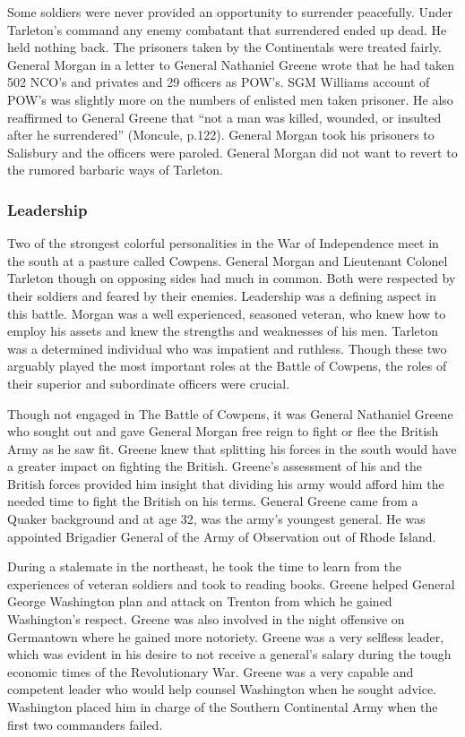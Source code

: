 Some soldiers were never provided an opportunity to surrender peacefully. Under
Tarleton’s command any enemy combatant that surrendered ended up dead.  He held
nothing back. The prisoners taken by the Continentals were treated fairly.
General Morgan in a letter to General Nathaniel Greene wrote that he had taken
502 NCO’s and privates and 29 officers as POW’s.  SGM Williams account of POW’s
was slightly more on the numbers of enlisted men taken prisoner. He also
reaffirmed to General Greene that “not a man was killed, wounded, or insulted
after he surrendered” (Moncule, p.122).  General Morgan took his prisoners to
Salisbury and the officers were paroled. General Morgan did not want to revert
to the rumored barbaric ways of Tarleton. 

\subsubsection{Leadership}

Two of the strongest colorful personalities in the War of Independence meet in
the south at a pasture called Cowpens. General Morgan and Lieutenant Colonel
Tarleton though on opposing sides had much in common. Both were respected by
their soldiers and feared by their enemies. Leadership was a defining aspect in
this battle.  Morgan was a well experienced, seasoned veteran, who knew how to
employ his assets and knew the strengths and weaknesses of his men.  Tarleton
was a determined individual who was impatient and ruthless. Though these two
arguably played the most important roles at the Battle of Cowpens, the roles of
their superior and subordinate officers were crucial. 

Though not engaged in The Battle of Cowpens, it was General Nathaniel Greene who
sought out and gave General Morgan free reign to fight or flee the British Army
as he saw fit.  Greene knew that splitting his forces in the south would have a
greater impact on fighting the British. Greene’s assessment of his and the
British forces provided him insight that dividing his army would afford him the
needed time to fight the British on his terms. General Greene came from a Quaker
background and at age 32, was the army’s youngest general. He was appointed
Brigadier General of the Army of Observation out of Rhode Island.

During a stalemate in the northeast, he took the time to learn from the
experiences of veteran soldiers and took to reading books. Greene helped General
George Washington plan and attack on Trenton from which he gained Washington’s
respect. Greene was also involved in the night offensive on Germantown where he
gained more notoriety. Greene was a very selfless leader, which was evident in
his desire to not receive a general’s salary during the tough economic times of
the Revolutionary War. Greene was a very capable and competent leader who would
help counsel Washington when he sought advice.  Washington placed him in charge
of the Southern Continental Army when the first two commanders failed. 


